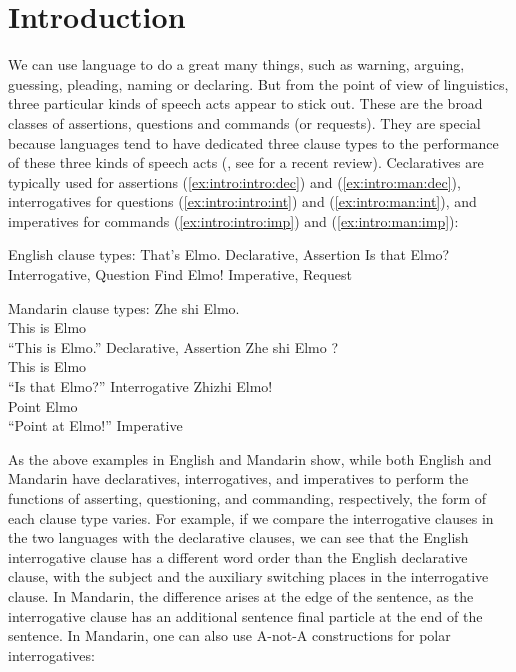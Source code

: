 \chapter{Introduction}
\label{chap:introduction}

We can use language to do a great many things, such as warning, arguing, guessing, pleading, naming or declaring. But from the point of view of linguistics, three particular kinds of speech acts appear to stick out.
These are the broad classes of assertions, questions and commands (or requests). They are special because
languages tend to have dedicated three clause types to the performance of these three kinds of speech acts (\citealt{sz1985speechact, konig2007, aikhenvald2016, portner2018}, see \cite{konig2020} for a recent review). Ceclaratives are typically used for assertions (\ref{ex:intro:intro:dec}) and (\ref{ex:intro:man:dec}), interrogatives for questions (\ref{ex:intro:intro:int}) and (\ref{ex:intro:man:int}), and imperatives for commands (\ref{ex:intro:intro:imp}) and (\ref{ex:intro:man:imp}):

English clause types:
\bxl \label{ex:intro:intro:dec}
That's Elmo. \hfill Declarative, Assertion
\ex\label{ex:intro:intro:int} Is that Elmo? \hfill Interrogative, Question
\ex\label{ex:intro:intro:imp} Find Elmo! \hfill Imperative, Request
\exl
\eex

Mandarin clause types:
\bxl \label{ex:intro:man:dec}
\gll Zhe shi Elmo.\\
This is Elmo\\
\trans ``This is Elmo.'' \hfill Declarative, Assertion
\ex \label{ex:intro:man:int}
\gll Zhe shi Elmo ?\\
This is Elmo \Sfp\\
\trans ``Is that Elmo?'' \hfill Interrogative
\ex \label{ex:intro:man:imp}
\gll Zhizhi Elmo!\\
Point Elmo\\
\trans ``Point at Elmo!'' \hfill Imperative
\exl
\eex

As the above examples in English and Mandarin show, while both English and Mandarin have declaratives, interrogatives, and imperatives to perform the functions of asserting, questioning, and commanding, respectively, the form of each clause type varies. For example, if we compare the interrogative clauses in the two languages with the declarative clauses, we can see that the English interrogative clause has a different word order than the English declarative clause, with the subject and the auxiliary switching places in the interrogative clause. In Mandarin, the difference arises at the edge of the sentence, as the interrogative clause has an additional sentence final particle  at the end of the sentence. In Mandarin, one can also use A-not-A constructions for polar interrogatives:

